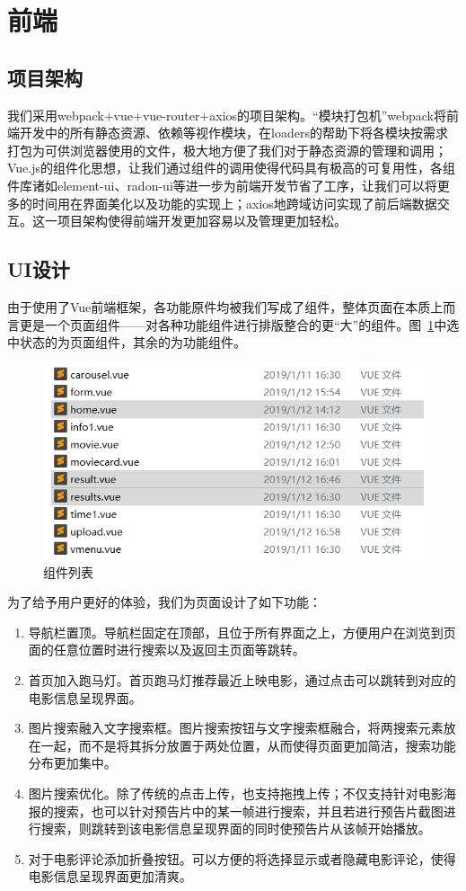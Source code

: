 \documentclass[main.tex]{subfiles}
\begin{document}
\section{前端}
\subsection{项目架构}

我们采用webpack+vue+vue-router+axios的项目架构。“模块打包机”webpack将前端开发中的所有静态资源、依赖等视作模块，在loaders的帮助下将各模块按需求打包为可供浏览器使用的文件，极大地方便了我们对于静态资源的管理和调用；Vue.js的组件化思想，让我们通过组件的调用使得代码具有极高的可复用性，各组件库诸如element-ui、radon-ui等进一步为前端开发节省了工序，让我们可以将更多的时间用在界面美化以及功能的实现上；axios地跨域访问实现了前后端数据交互。这一项目架构使得前端开发更加容易以及管理更加轻松。

\subsection{UI设计}

由于使用了Vue前端框架，各功能原件均被我们写成了组件，整体页面在本质上而言更是一个页面组件——对各种功能组件进行排版整合的更“大”的组件。图~\ref{fig:components}中选中状态的为页面组件，其余的为功能组件。

\begin{figure}[h]
    \centering
    \includegraphics[width=0.5\linewidth]{images/components.png}
    \caption{组件列表}
    \label{fig:components}
\end{figure}

为了给予用户更好的体验，我们为页面设计了如下功能：

\begin{enumerate}
    \item 导航栏置顶。导航栏固定在顶部，且位于所有界面之上，方便用户在浏览到页面的任意位置时进行搜索以及返回主页面等跳转。
    \item 首页加入跑马灯。首页跑马灯推荐最近上映电影，通过点击可以跳转到对应的电影信息呈现界面。
    \item 图片搜索融入文字搜索框。图片搜索按钮与文字搜索框融合，将两搜索元素放在一起，而不是将其拆分放置于两处位置，从而使得页面更加简洁，搜索功能分布更加集中。
    \item 图片搜索优化。除了传统的点击上传，也支持拖拽上传；不仅支持针对电影海报的搜索，也可以针对预告片中的某一帧进行搜索，并且若进行预告片截图进行搜索，则跳转到该电影信息呈现界面的同时使预告片从该帧开始播放。
    \item 对于电影评论添加折叠按钮。可以方便的将选择显示或者隐藏电影评论，使得电影信息呈现界面更加清爽。
\end{enumerate}
\end{document}
